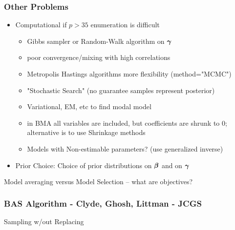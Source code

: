 \documentclass[handout]{beamer}
\begin{document}
\begin{frame}\frametitle{ Other Problems}


  \begin{itemize}
  \item Computational \pause 
  if $p > 35$  enumeration is difficult \pause 
  \begin{itemize}
  \item Gibbs sampler or Random-Walk algorithm on $\boldsymbol{\gamma}$ \pause 
  \item poor convergence/mixing with high correlations \pause 
  \item Metropolis Hastings algorithms more flexibility
    (method="MCMC") \pause 
  \item "Stochastic Search" (no guarantee samples represent posterior)
    \pause 
\item Variational, EM, etc to find modal model \pause
  \item in BMA all variables are included, but coefficients are 
   shrunk to 0; alternative is to use Shrinkage methods \pause 
  \item Models with Non-estimable parameters?   (use generalized inverse)
  \end{itemize}
\item Prior Choice: Choice of prior distributions on $\boldsymbol{\beta}$ and on $\boldsymbol{\gamma}$
  \pause 
\end{itemize}

\bigskip Model averaging versus Model Selection  -- what are objectives?


\end{frame}

\begin{frame}\frametitle{BAS Algorithm - Clyde, Ghosh, Littman - JCGS}
  Sampling w/out Replacing
\end{frame}
\end{document}
